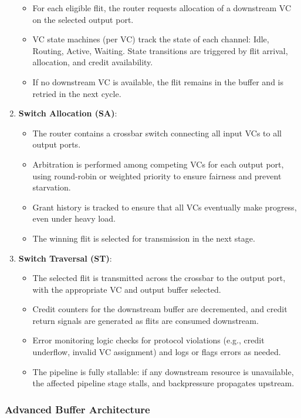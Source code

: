 \documentclass[11pt,a4paper]{article}
\begin{document}
\begin{enumerate}
\begin{itemize}
        \item For each eligible flit, the router requests allocation of a downstream VC on the selected output port.
        \item VC state machines (per VC) track the state of each channel: Idle, Routing, Active, Waiting. State transitions are triggered by flit arrival, allocation, and credit availability.
        \item If no downstream VC is available, the flit remains in the buffer and is retried in the next cycle.
    \end{itemize}
    \item \textbf{Switch Allocation (SA)}:
    \begin{itemize}
        \item The router contains a crossbar switch connecting all input VCs to all output ports.
        \item Arbitration is performed among competing VCs for each output port, using round-robin or weighted priority to ensure fairness and prevent starvation.
        \item Grant history is tracked to ensure that all VCs eventually make progress, even under heavy load.
        \item The winning flit is selected for transmission in the next stage.
    \end{itemize}
    \item \textbf{Switch Traversal (ST)}:
    \begin{itemize}
        \item The selected flit is transmitted across the crossbar to the output port, with the appropriate VC and output buffer selected.
        \item Credit counters for the downstream buffer are decremented, and credit return signals are generated as flits are consumed downstream.
        \item Error monitoring logic checks for protocol violations (e.g., credit underflow, invalid VC assignment) and logs or flags errors as needed.
        \item The pipeline is fully stallable: if any downstream resource is unavailable, the affected pipeline stage stalls, and backpressure propagates upstream.
    \end{itemize}
\end{enumerate}

\subsubsection{Advanced Buffer Architecture}
\end{document}
